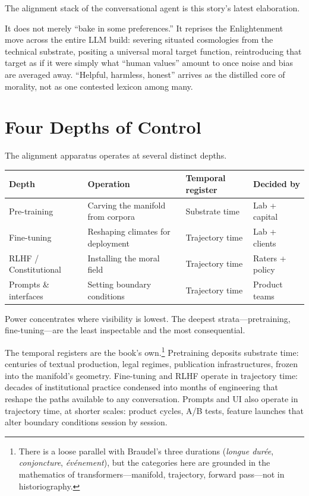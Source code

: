 The alignment stack of the conversational agent is this story's latest elaboration.

It does not merely ``bake in some preferences.'' It reprises the Enlightenment move across the entire LLM build: severing situated cosmologies from the technical substrate, positing a universal moral target function, reintroducing that target as if it were simply what ``human values'' amount to once noise and bias are averaged away. ``Helpful, harmless, honest'' arrives as the distilled core of morality, not as one contested lexicon among many.

\section{Four Depths of Control}

The alignment apparatus operates at several distinct depths.

\begin{formalbox}[title={Four Depths of Control}]
\begin{tabular}{p{2.5cm} p{3.5cm} p{3cm} p{2.5cm}}
\textbf{Depth} & \textbf{Operation} & \textbf{Temporal register} & \textbf{Decided by} \\
\hline
Pre-training & Carving the manifold from corpora & Substrate time & Lab + capital \\
Fine-tuning & Reshaping climates for deployment & Trajectory time & Lab + clients \\
RLHF / Constitutional & Installing the moral field & Trajectory time & Raters + policy \\
Prompts \& interfaces & Setting boundary conditions & Trajectory time & Product teams \\
\end{tabular}

Power concentrates where visibility is lowest. The deepest strata---pretraining, fine-tuning---are the least inspectable and the most consequential.
\end{formalbox}

The temporal registers are the book's own.\footnote{There is a loose parallel with Braudel's three durations (\emph{longue dur\'ee}, \emph{conjoncture}, \emph{\'ev\'enement}), but the categories here are grounded in the mathematics of transformers---manifold, trajectory, forward pass---not in historiography.} Pretraining deposits substrate time: centuries of textual production, legal regimes, publication infrastructures, frozen into the manifold's geometry. Fine-tuning and RLHF operate in trajectory time: decades of institutional practice condensed into months of engineering that reshape the paths available to any conversation. Prompts and UI also operate in trajectory time, at shorter scales: product cycles, A/B tests, feature launches that alter boundary conditions session by session.

